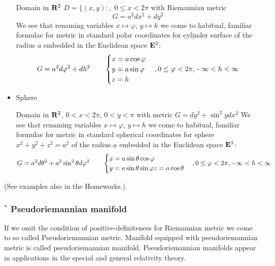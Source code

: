 \documentclass[12pt]{article}
\theoremstyle{theorem}
\numberwithin{equation}{section}
\begin{document}
\begin{itemize}
     Domain in ${\bf R}^2$ $D=\{(x,y)\colon,\,\, 0\leq x< 2\pi$ with Riemannian  metric
           \begin{equation}\label{domainascylinder1}
          G=  a^2dx^2+dy^2
           \end{equation}
We see that renaming variables $x\mapsto \varphi $, $y\mapsto h$ we come to habitual, familiar formulae for
metric in standard polar coordinates
for cylinder surface of the radius $a$ embedded in the Euclidean space ${\bf E}^3$:
           \begin{equation}\label{domainascylinder2}
          G= a^2d\varphi^2+dh^2\qquad
          \begin{cases}
          x=a\cos\varphi\cr
          y=a\sin\varphi\cr
          z=h\cr
          \end {cases},
          0\leq \varphi <2\pi, -\infty<h<\infty
           \end{equation}


 \item  Sphere

   Domain in ${\bf R}^2$,  $0<x<2\pi$, $0<y<\pi$ with metric $G=dy^2+\sin^2 y dx^2$
We see that renaming variables $x\mapsto \varphi $, $y\mapsto h$ we come to habitual, familiar formulae for
metric in standard spherical coordinates
for sphere $x^2+y^2+z^2=a^2$ of the radius $a$ embedded in the Euclidean space ${\bf E}^3$:
           \begin{equation}\label{domainascylinder2}
          G= a^2d\theta^2+a^2\sin^2\theta
          d\varphi^2\qquad
          \begin{cases}
          x=a\sin\theta\cos\varphi\cr
          y=a\sin\theta\sin\varphi
          z=a\cos\theta
          \end {cases},
          0\leq \varphi <2\pi, -\infty<h<\infty
           \end{equation}

\end{itemize}
(See examples also in the Homeworks.)



\subsubsection {$^*$ Pseudoriemannian manifold} If we omit the
condition of positive-definiteness for Riemannian metric we come to so
called  Pseudoriemannian metric.
Manifold equipped with pseudoriemannian metric is called
pseudoriemannian manifold.  Pseudoriemannian manifolds
appear in applications in the special and general
relativity theory.
\end{document}

